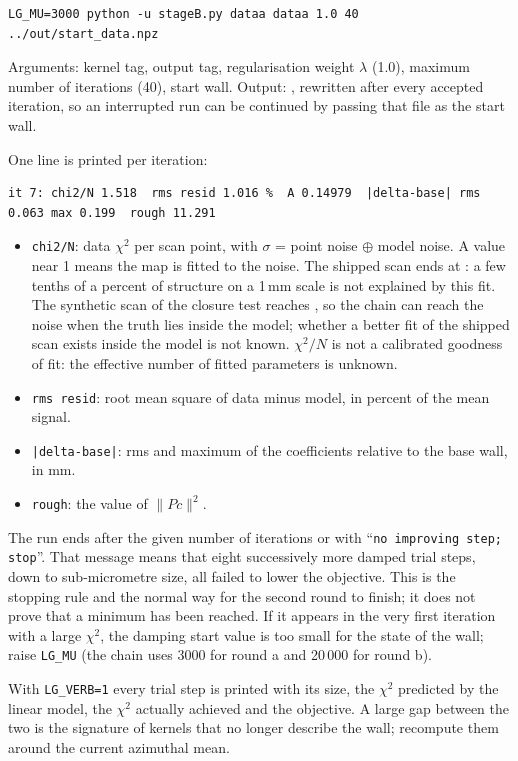 \documentclass[11pt,a4paper]{article}
\newcommand{\code}[1]{\texttt{#1}}
\begin{document}
\begin{lstlisting}
LG_MU=3000 python -u stageB.py dataa dataa 1.0 40 ../out/start_data.npz
\end{lstlisting}
Arguments: kernel tag, output tag, regularisation weight $\lambda$ (1.0), maximum number of
iterations (40), start wall. Output: , rewritten after every accepted
iteration, so an interrupted run can be continued by passing that file as the start wall.

One line is printed per iteration:
\begin{lstlisting}
it 7: chi2/N 1.518  rms resid 1.016 %  A 0.14979  |delta-base| rms 0.063 max 0.199  rough 11.291
\end{lstlisting}
\begin{itemize}
\item \code{chi2/N}: data $\chi^2$ per scan point, with $\sigma$ = point noise $\oplus$ model noise.
A value near 1 means the map is fitted to the noise. The shipped scan ends at \ChiTwo: a few tenths of a percent
of structure on a 1\,mm scale is not explained by this fit. The synthetic scan of the closure test
reaches \ClChiTwo, so the chain can reach the noise when the truth lies inside the model; whether a
better fit of the shipped scan exists inside the model is not known. $\chi^2/N$ is not a calibrated
goodness of fit: the effective number of fitted parameters is unknown.
\item \code{rms resid}: root mean square of data minus model, in percent of the mean signal.
\item \code{|delta-base|}: rms and maximum of the coefficients relative to the base wall, in mm.
\item \code{rough}: the value of $\lVert Pc\rVert^2$.
\end{itemize}
The run ends after the given number of iterations or with ``\code{no improving step; stop}''. That
message means that eight successively more damped trial steps, down to sub-micrometre size, all
failed to lower the objective. This is the stopping rule and the normal way for the second round to
finish; it does not prove that a minimum has been reached. If it appears in the very first iteration with a large $\chi^2$, the damping
start value is too small for the state of the wall; raise \code{LG\_MU} (the chain uses 3000 for
round a and 20\,000 for round b).

With \code{LG\_VERB=1} every trial step is printed with its size, the $\chi^2$ predicted by the linear
model, the $\chi^2$ actually achieved and the objective. A large gap between the two is the signature of kernels that
no longer describe the wall; recompute them around the current azimuthal mean.
\end{document}
